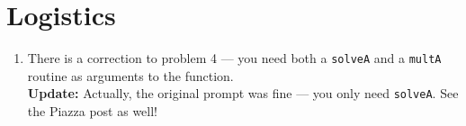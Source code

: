 \section{Logistics}

\begin{enumerate}
\item There is a correction to problem 4 --- you need both a {\tt solveA}
  and a {\tt multA} routine as arguments to the function. \\
  {\bf Update:} Actually, the original prompt was fine --- you only need
  {\tt solveA}.  See the Piazza post as well!
\end{enumerate}
